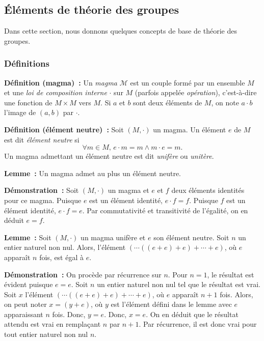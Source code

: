 \subsection{Éléments de théorie des groupes}

Dans cette section, nous donnons quelques concepts de base de théorie des groupes. 

\subsubsection{Définitions}

\noindent\textbf{Définition (magma) :} Un \textit{magma} $\mathcal{M}$ est un couple formé par un ensemble $M$ et une \textit{loi de composition interne} $\cdot$ sur $M$ (parfois appelée \textit{opération}), c'est-à-dire une fonction de $M \times M$ vers $M$. 
    Si $a$ et $b$ sont deux éléments de $M$, on note $a \cdot b$ l'image de $(a,b)$ par $\cdot$.

\medskip

\noindent\textbf{Définition (élément neutre) :} Soit $(M,\cdot)$ un magma.
    Un élément $e$ de $M$ est dit \textit{élément neutre} si 
    \begin{equation*}
        \forall m \in M, \, e \cdot m = m \wedge m \cdot e = m.
    \end{equation*}
    Un magma admettant un élément neutre est dit \textit{unifère} ou \textit{unitère}.

\medskip

\noindent\textbf{Lemme :} Un magma admet au plus un élément neutre.

\medskip

\noindent\textbf{Démonstration :} Soit $(M,\cdot)$ un magma et $e$ et $f$ deux éléments identités pour ce magma.
    Puisque $e$ est un élément identité, $e \cdot f = f$.
    Puisque $f$ est un élément identité, $e \cdot f = e$.
    Par commutativité et transitivité de l'égalité, on en déduit $e = f$.

    \hfill \square

\medskip

\medskip

\noindent\textbf{Lemme :} Soit $(M, \cdot)$ un magma unifère et $e$ son élément neutre.
    Soit $n$ un entier naturel non nul.
    Alors, l'élément $(\cdots ((e+e) + e) + \cdots +e)$, où $e$ apparaît $n$ fois, est égal à $e$.

\medskip

\noindent\textbf{Démonstration :} On procède par récurrence sur $n$. 
    Pour $n = 1$, le résultat est évident puisque $e = e$.
    Soit $n$ un entier naturel non nul tel que le résultat est vrai. 
    Soit $x$ l'élément $(\cdots ((e+e) + e) + \cdots + e)$, où $e$ apparaît $n+1$ fois. 
    Alors, on peut noter $x = (y + e)$, où $y$ est l'élément défini dans le lemme avec $e$ apparaissant $n$ fois. 
    Donc, $y = e$.
    Donc, $x = e$. 
    On en déduit que le résultat attendu est vrai en remplaçant $n$ par $n+1$. 
    Par récurrence, il est donc vrai pour tout entier naturel non nul $n$.

